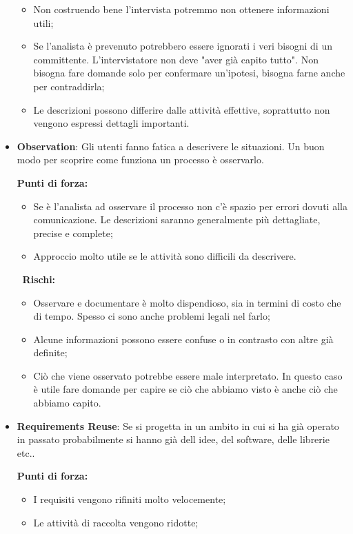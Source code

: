 \begin{itemize}
\begin{info}[]
\begin{itemize}
			\item Non costruendo bene l'intervista potremmo non ottenere informazioni utili;
			\item Se l'analista è prevenuto potrebbero essere ignorati i veri bisogni di un committente. L'intervistatore non deve "aver già capito tutto". Non bisogna fare domande solo per confermare un'ipotesi, bisogna farne anche per contraddirla;
			\item Le descrizioni possono differire dalle attività effettive, soprattutto non vengono espressi dettagli importanti.
		\end{itemize}
	\end{info}
	\item \textbf{Observation}: Gli utenti fanno fatica a descrivere le situazioni. Un buon modo per scoprire come funziona un processo è osservarlo.
	\begin{info}[]
		\textbf{Punti di forza:}
		\begin{itemize}
			\item Se è l'analista ad osservare il processo non c'è spazio per errori dovuti alla comunicazione. Le descrizioni saranno generalmente più dettagliate, precise e complete;
			\item Approccio molto utile se le attività sono difficili da descrivere.
		\end{itemize}
		$\;\;$\textbf{Rischi:}
		\begin{itemize}
			\item Osservare e documentare è molto dispendioso, sia in termini di costo che di tempo. Spesso ci sono anche problemi legali nel farlo;
			\item Alcune informazioni possono essere confuse o in contrasto con altre già definite;
			\item Ciò che viene osservato potrebbe essere male interpretato. In questo caso è utile fare domande per capire se ciò che abbiamo visto è anche ciò che abbiamo capito.
		\end{itemize}
	\end{info}
	\item \textbf{Requirements Reuse}: Se si progetta in un ambito in cui si ha già operato in passato probabilmente si hanno già dell idee, del software, delle librerie etc..
	\begin{info}[]
		\textbf{Punti di forza:}
		\begin{itemize}
			\item I requisiti vengono rifiniti molto velocemente;
			\item Le attività di raccolta vengono ridotte;

\end{itemize}
\end{info}
\end{itemize}
